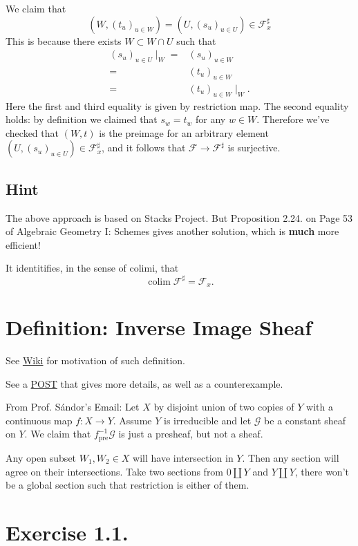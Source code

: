 We claim that \[(W,(t_u)_{u\in W})=(U,(s_u)_{u\in U})\in \mathscr F^{\sharp}_x\]
This is because there exists $W\subset W\cap U$ such that \begin{align*}
    (s_u)_{u\in U}\mid_W =& (s_u)_{u\in W}\\
    =& (t_u)_{u\in W}\\
    =& (t_u)_{u\in W}\mid_W.
\end{align*}Here the first and third equality is given by restriction map. The second equality holds: by definition we claimed that $s_w=t_w$ for any $w\in W$. Therefore we've checked that $(W,t)$ is the preimage for an arbitrary element $(U,(s_u)_{u\in U})\in \mathscr F^{\sharp}_x$, and it follows that $\mathscr F\to\mathscr F^{\sharp}$ is surjective.

\subsection{Hint}

The above approach is based on Stacks Project. But Proposition 2.24. on Page 53 of Algebraic Geometry I: Schemes \cite{gortz2020algebraic} gives another solution, which is \textbf{much} more efficient!

It identitifies, in the sense of colimi, that
\[\operatorname{colim}\mathscr F^{\sharp}=\mathscr F_x.\]
  

\section{Definition: Inverse Image Sheaf}

See \href{https://en.wikipedia.org/wiki/Inverse_image_functor}{Wiki} for motivation of such definition.

See a \href{https://en.wikipedia.org/wiki/Inverse_image_functor}{POST} that gives more details, as well as a counterexample.

From Prof. S\'andor's Email: Let $X$ by disjoint union of two copies of $Y$ with a continuous map $f:X\to Y$. Assume $Y$ is irreducible and let $\mathscr G$ be a constant sheaf on $Y$. We claim that $f^{-1}_{\text{pre}} \mathscr G$ is just a presheaf, but not a sheaf. 

Any open subset $W_1, W_2\in X$ will have intersection in $Y$. Then any section will agree on their intersections. Take two sections from $0\amalg Y$ and $Y\amalg Y$, there won't be a global section such that restriction is either of them.

\section{Exercise 1.1.}

